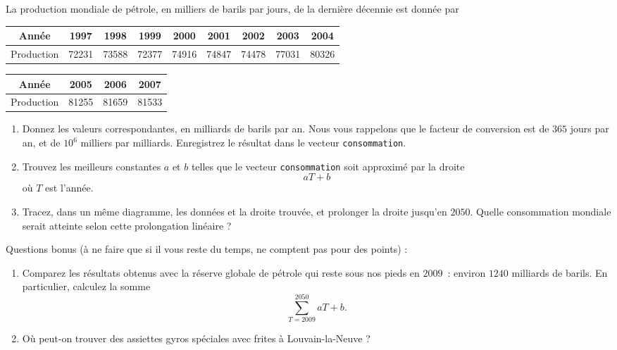 \begin{exercice}\label{exoMatlab0017}

	La production mondiale de pétrole, en milliers de barils par jours, de la dernière décennie est donnée par

	\begin{center}
	\begin{tabular}{|c|cccccccc|}
	\hline
	Année & 1997 & 1998 & 1999 & 2000 & 2001 & 2002 & 2003 & 2004  \\
	\hline
	Production & 72231 &	73588 &	72377 &	74916 &	74847 &	74478 &	77031 &	80326\\
	\hline
	\end{tabular}
	\end{center}

	\begin{center}
	\begin{tabular}{|c|ccc|}
	\hline
	Année & 2005 & 2006 & 2007 \\
	\hline
	Production & 81255 &	81659 & 81533\\
	\hline
	\end{tabular}
	\end{center}
	
	
	 \begin{enumerate}

		 \item
			 Donnez les valeurs correspondantes, en milliards de barils par an. Nous vous rappelons que le facteur de conversion est de $365$ jours par an, et de $10^6$ milliers par milliards. Enregistrez le résultat dans le vecteur \verb+consommation+.
		\item
			Trouvez les meilleurs constantes $a$ et $b$ telles que le vecteur \verb+consommation+ soit approximé par la droite
			\begin{equation}
				aT+b
			\end{equation}
			où $T$ est l'année.

		\item
			Tracez, dans un même diagramme, les données et la droite trouvée, et prolonger la droite jusqu'en $2050$. Quelle consommation mondiale serait atteinte selon cette prolongation linéaire ?

	 \end{enumerate}

	 Questions bonus (à ne faire que si il vous reste du temps, ne comptent pas pour des points) :
	 \begin{enumerate}

		\item
			Comparez les résultats obtenus avec la réserve globale de pétrole qui reste sous nos pieds en $2009$~: environ $1240$ milliards de barils. En particulier, calculez la somme
			\begin{equation}
				\sum_{T=2009}^{2050}aT+b.
			\end{equation}
			 
		\item
			Où peut-on trouver des assiettes gyros spéciales avec frites à Louvain-la-Neuve ?
	 \end{enumerate}


\end{exercice}
